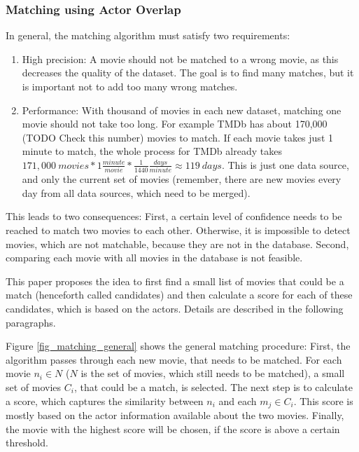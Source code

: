 \subsubsection{Matching using Actor Overlap}
In general, the matching algorithm must satisfy two requirements:
\begin{enumerate}
	\item{High precision:} A movie should not be matched to a wrong movie, as this decreases the quality of the dataset.
	The goal is to find many matches, but it is important not to add too many wrong matches.
	\item{Performance:} With thousand of movies in each new dataset, matching one movie should not take too long.
	For example TMDb has about 170,000 (TODO Check this number) movies to match.
	If each movie takes just 1 minute to match, the whole process for TMDb already takes $171,000~movies * 1 \frac{minute}{movie} * \frac{1}{1440} \frac{days}{minute} \approx 119~days$.
	This is just one data source, and only the current set of movies (remember, there are new movies every day from all data sources, which need to be merged).
\end{enumerate}

This leads to two consequences: First, a certain level of confidence needs to be reached to match two movies to each other. Otherwise, it is impossible to detect movies, which are not matchable, because they are not in the database.
Second, comparing each movie with all movies in the database is not feasible.

This paper proposes the idea to first find a small list of movies that could be a match (henceforth called candidates) and then calculate a score for each of these candidates, which is based on the actors.
Details are described in the following paragraphs.

Figure \ref{fig_matching_general} shows the general matching procedure:
First, the algorithm passes through each new movie, that needs to be matched.
For each movie $n_i \in N$ ($N$ is the set of movies, which still needs to be matched), a small set of movies $C_{i}$, that could be a match, is selected.
The next step is to calculate a score, which captures the similarity between $n_i$ and each $m_j \in C_i$.
This score is mostly based on the actor information available about the two movies.
Finally, the movie with the highest score will be chosen, if the score is above a certain threshold.

